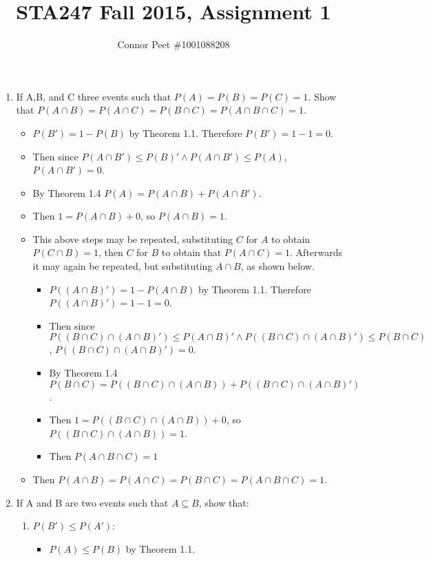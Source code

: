\documentclass{article}
\title{STA247 Fall 2015, Assignment 1}
\author{Connor Peet \#1001088208}
\begin{document}
\maketitle

\begin{enumerate}
\item If A,B, and C three events such that $P(A) = P(B) = P(C) = 1$. Show that
$P(A \cap B) = P(A \cap C) = P(B \cap C) = P(A \cap B \cap C) = 1$.
    \begin{itemize}
    \item $P(B') = 1 - P(B)$ by Theorem 1.1. Therefore $P(B') = 1 - 1 = 0$.
    \item Then since $P(A \cap B') \leq P(B)' \land P(A \cap B') \leq P(A)$, $P(A \cap B') = 0$.
    \item By Theorem 1.4 $P(A) = P(A \cap B) + P(A \cap B')$.
    \item Then $1 = P(A \cap B) + 0$, so $P(A \cap B) = 1$.
    \item This above steps may be repeated, substituting $C$ for $A$ to obtain $P(C \cap B) = 1$, then $C$ for $B$ to obtain that $P(A \cap C) = 1$. Afterwards it may again be repeated, but substituting $A \cap B$, as shown below.
        \begin{itemize}
        \item $P((A \cap B)') = 1 - P(A \cap B)$ by Theorem 1.1. Therefore $P((A \cap B)') = 1 - 1 = 0$.
        \item Then since $P((B \cap C) \cap (A \cap B)') \leq P(A \cap B)' \land P((B \cap C) \cap (A \cap B)') \leq P(B \cap C)$, $P((B \cap C) \cap (A \cap B)') = 0$.
        \item By Theorem 1.4 $P(B \cap C) = P((B \cap C) \cap (A \cap B)) + P((B \cap C) \cap (A \cap B)')$.
        \item Then $1 = P((B \cap C) \cap (A \cap B)) + 0$, so $P((B \cap C) \cap (A \cap B)) = 1$.
        \item Then $P(A \cap B \cap C) = 1$
        \end{itemize}
    \item Then $P(A \cap B) = P(A \cap C) = P(B \cap C) = P(A \cap B \cap C) = 1$.
    \end{itemize}
\item If A and B are two events such that $A \subseteq B$, show that:
    \begin{enumerate}
    \item $P(B') \leq P(A')$:
        \begin{itemize}
        \item $P(A) \leq P(B)$ by Theorem 1.1.

\end{itemize}
\end{enumerate}
\end{enumerate}
\end{document}
